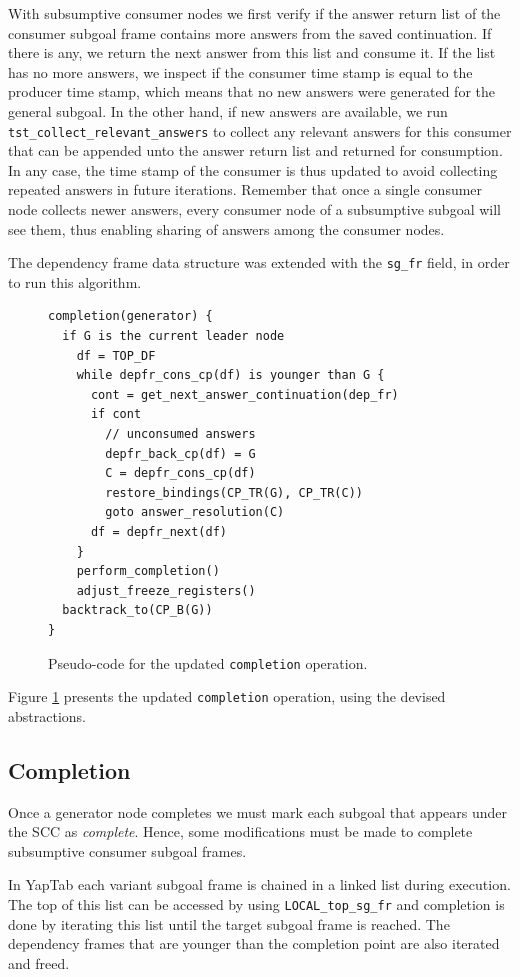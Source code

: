 With subsumptive consumer nodes we first verify if the answer return list of the
consumer subgoal frame contains more answers from the saved continuation. If there is
any, we return the next answer from this list and consume it. If the list has no more answers,
we inspect if the consumer time stamp is equal to the producer time stamp, which means
that no new answers were generated for the general subgoal. In the other hand, if new
answers are available, we run \texttt{tst\_collect\_relevant\_answers} to collect any
relevant answers for this consumer that can be appended unto the answer return list
and returned for consumption.
In any case, the time stamp of the consumer is thus updated to avoid collecting
repeated answers in future iterations. Remember that once a single consumer node
collects newer answers, every consumer node of a subsumptive subgoal will see them, thus
enabling sharing of answers among the consumer nodes.

The dependency frame data structure was extended with the \texttt{sg\_fr} field,
in order to run this algorithm.

\begin{figure}[ht]
\begin{Verbatim}
completion(generator) {
  if G is the current leader node
    df = TOP_DF
    while depfr_cons_cp(df) is younger than G {
      cont = get_next_answer_continuation(dep_fr)
      if cont
        // unconsumed answers
        depfr_back_cp(df) = G
        C = depfr_cons_cp(df)
        restore_bindings(CP_TR(G), CP_TR(C))
        goto answer_resolution(C)
      df = depfr_next(df)
    }
    perform_completion()
    adjust_freeze_registers()
  backtrack_to(CP_B(G))
}
\end{Verbatim}
\caption{Pseudo-code for the updated \texttt{completion} operation.}
\label{fig:completion_operation}
\end{figure}

Figure \ref{fig:completion_operation} presents the updated \texttt{completion} operation,
using the devised abstractions.

\subsection{Completion}

Once a generator node completes we must mark each subgoal that appears under the SCC as \textit{complete}.
Hence, some modifications must be made to complete subsumptive consumer subgoal frames.

In YapTab each variant subgoal frame is chained in a linked list during execution. The top of this list
can be accessed by using \texttt{LOCAL\_top\_sg\_fr} and completion is done by iterating this list until
the target subgoal frame is reached. The dependency frames that are younger than the completion point
are also iterated and freed. 

